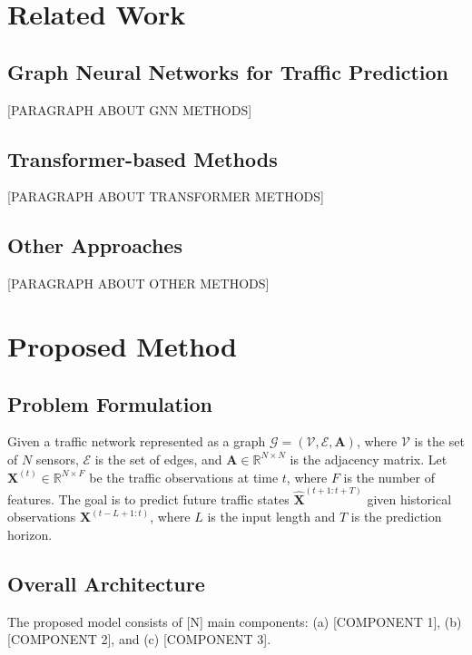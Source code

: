 \documentclass[journal,10pt]{IEEEtran}
\begin{document}
\section{Related Work}
\label{sec:related}

\subsection{Graph Neural Networks for Traffic Prediction}
[PARAGRAPH ABOUT GNN METHODS]

\subsection{Transformer-based Methods}
[PARAGRAPH ABOUT TRANSFORMER METHODS]

\subsection{Other Approaches}
[PARAGRAPH ABOUT OTHER METHODS]

\section{Proposed Method}
\label{sec:method}

\subsection{Problem Formulation}
\label{sec:problem}

Given a traffic network represented as a graph $\mathcal{G} = (\mathcal{V}, \mathcal{E}, \mathbf{A})$,
where $\mathcal{V}$ is the set of $N$ sensors, $\mathcal{E}$ is the set of edges,
and $\mathbf{A} \in \mathbb{R}^{N \times N}$ is the adjacency matrix.
Let $\mathbf{X}^{(t)} \in \mathbb{R}^{N \times F}$ be the traffic observations at time $t$,
where $F$ is the number of features.
The goal is to predict future traffic states $\hat{\mathbf{X}}^{(t+1:t+T)}$
given historical observations $\mathbf{X}^{(t-L+1:t)}$,
where $L$ is the input length and $T$ is the prediction horizon.

\subsection{Overall Architecture}
\label{sec:architecture}

The proposed model consists of [N] main components:
(a) [COMPONENT 1], (b) [COMPONENT 2], and (c) [COMPONENT 3].
\end{document}
